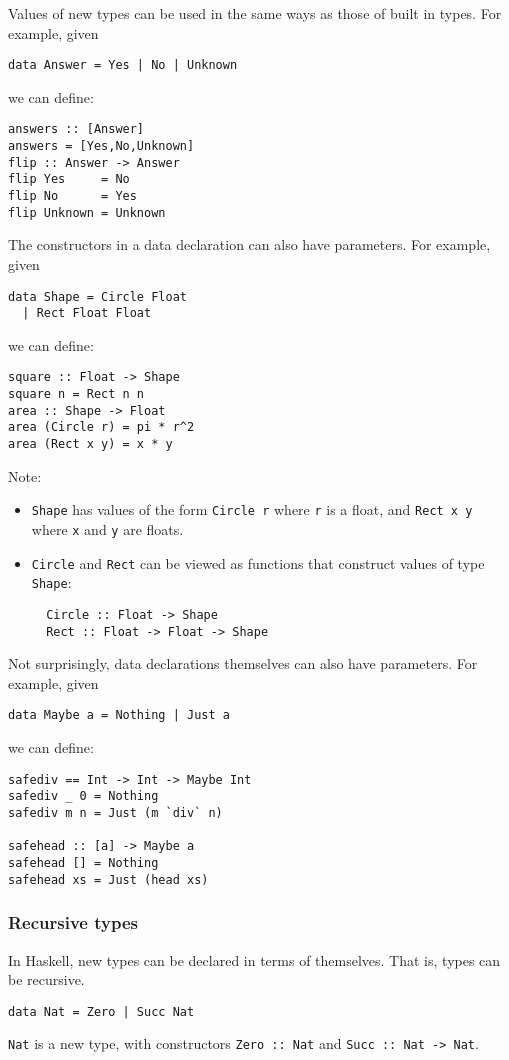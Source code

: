 \begin{multicols}{2}
Values of new types can be used in the same ways as those of built in types.
For example, given
\begin{lstlisting}
data Answer = Yes | No | Unknown
\end{lstlisting}
we can define:
\begin{lstlisting}
answers :: [Answer]
answers = [Yes,No,Unknown]
flip :: Answer -> Answer
flip Yes     = No
flip No      = Yes
flip Unknown = Unknown
\end{lstlisting}

The constructors in a data declaration can also have parameters.
For example, given
\begin{lstlisting}
data Shape = Circle Float
  | Rect Float Float
\end{lstlisting}
we can define:
\begin{lstlisting}
square :: Float -> Shape
square n = Rect n n
area :: Shape -> Float
area (Circle r) = pi * r^2
area (Rect x y) = x * y
\end{lstlisting}

Note:
\begin{itemize}
  \item \lstinline{Shape} has values of the form \lstinline{Circle r} where \lstinline{r} is a float, and \lstinline{Rect x y} where \lstinline{x} and \lstinline{y} are floats.
  \item \lstinline{Circle} and \lstinline{Rect} can be viewed as functions that construct values of type \lstinline{Shape}:
  \begin{lstlisting}
  Circle :: Float -> Shape
  Rect :: Float -> Float -> Shape
  \end{lstlisting}
\end{itemize}

Not surprisingly, data declarations themselves can also have parameters.
For example, given
\begin{lstlisting}
data Maybe a = Nothing | Just a
\end{lstlisting}
we can define:
\begin{lstlisting}
safediv == Int -> Int -> Maybe Int
safediv _ 0 = Nothing
safediv m n = Just (m `div` n)

safehead :: [a] -> Maybe a
safehead [] = Nothing
safehead xs = Just (head xs)
\end{lstlisting}

\subsubsection{Recursive types}
In Haskell, new types can be declared in terms of themselves.
That is, types can be recursive.
\begin{lstlisting}
data Nat = Zero | Succ Nat
\end{lstlisting}
\lstinline{Nat} is a new type, with constructors \lstinline{Zero :: Nat} and \lstinline{Succ :: Nat -> Nat}.


\end{multicols}
